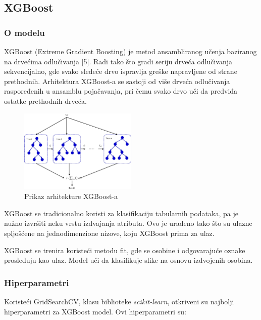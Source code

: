 \documentclass{article}
\begin{document}
\subsection{XGBoost}

\subsubsection{O modelu}
XGBoost (Extreme Gradient Boosting) je metod ansambliranog učenja baziranog na drvećima odlučivanja [5]. Radi tako što gradi seriju drveća odlučivanja sekvencijalno, gde svako sledeće drvo ispravlja greške napravljene od strane prethodnih. Arhitektura XGBoost-a se sastoji od više drveća odlučivanja raspoređenih u ansamblu pojačavanja, pri čemu svako drvo uči da predviđa ostatke prethodnih drveća.
\begin{figure}[H]
    \centering
    \includegraphics[width=0.5\textwidth]{xgboost.png} 
    \caption{Prikaz arhitekture XGBoost-a} 
    \label{arhitektura xgboost-a}
\end{figure}

XGBoost se tradicionalno koristi za klasifikaciju tabularnih podataka, pa je nužno izvršiti neku vrstu izdvajanja atributa. Ovo je urađeno tako što su ulazne spljošćene na jednodimenzione nizove, koju XGBoost prima za ulaz.
\par
XGBoost se trenira koristeći metodu fit, gde se osobine i odgovarajuće oznake prosleđuju kao ulaz. Model uči da klasifikuje slike na osnovu izdvojenih osobina.

\subsubsection{Hiperparametri}

Koristeći GridSearchCV, klasu biblioteke \textit{scikit-learn}, otkriveni su najbolji hiperparametri za XGBoost model. Ovi hiperparametri su:
\end{document}
